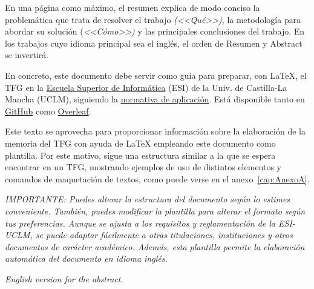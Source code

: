 \pagestyle{plain}	%


\begin{resumenPral}[spanish]
En una página como máximo, el resumen explica de modo conciso la problemática que trata de resolver el trabajo \emph{(<<Qué>>)}, la metodología para  abordar su solución (\emph{<<Cómo>>)} y las principales conclusiones del trabajo. En los trabajos cuyo idioma principal sea el inglés, el orden de \textsf{Resumen} y \textsf{Abstract} se invertirá. 

En concreto, este documento debe servir como guía para preparar, con \LaTeX, el TFG en la \href{http://webpub.esi.uclm.es/}{Escuela Superior de Informática} (ESI) de la Univ. de Castilla-La Mancha (UCLM), siguiendo la \href{https://esi.uclm.es/index.php/grado-en-ingenieria-informatica/trabajos-fin-de-grado/}{normativa de aplicación}. Está disponible tanto en \href{https://github.com/JesusSalido/TFG_ESI_UCLM}{GitHub} como \href{https://www.overleaf.com/latex/templates/plantilla-de-tfg-escuela-superior-de-informatica-uclm/phjgscmfqtsw}{Overleaf}.

Este texto se aprovecha para proporcionar información sobre la elaboración de la memoria del TFG con ayuda de \LaTeX{} empleando este documento como plantilla. Por este motivo, sigue una estructura similar a la que se espera encontrar en un TFG, mostrando ejemplos de uso de distintos elementos y comandos de maquetación de textos, como puede verse en el anexo~\ref{cap:AnexoA}.

\noindent\emph{IMPORTANTE: Puedes alterar la estructura del documento según lo estimes conveniente. También, puedes modificar la plantilla para alterar el formato según tus preferencias. Aunque se ajusta a los requisitos y reglamentación de la ESI-UCLM, se puede adaptar fácilmente a otras titulaciones, instituciones y otros documentos de carácter académico. Además, esta plantilla permite la elaboración automática del documento en idioma inglés.}
\end{resumenPral}


\begin{resumenAlt}[english]
\emph{English version for the abstract.}
\end{resumenAlt}



